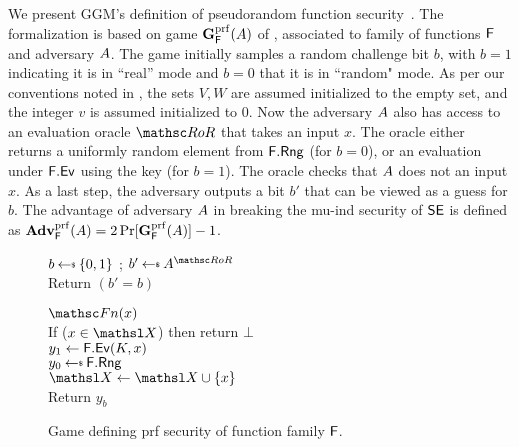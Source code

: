 
We present GGM's definition of pseudorandom function security~\cite{GolGolMic86}. The formalization is based on game $\gPRF{\FF}(\advA)$ of , associated to family of functions $\mathsf{F}$ and adversary $A$. The game initially samples a random challenge bit $b$, with $b=1$ indicating it is in ``real'' mode and $b=0$ that it is in ``random" mode. As per our conventions noted in ,  the sets $V,W$ are assumed initialized to the empty set, and the integer $v$ is assumed initialized to $0$. Now the adversary $A$ also has access to an evaluation oracle $\RoRO$ that takes an input $x$. The oracle either returns a uniformly random element from $\mathsf{F}.\mathsf{Rng}$ (for $b=0$), or an evaluation under $\mathsf{F}.\mathsf{Ev}$ using the key (for $b=1$). The oracle checks that $A$ does not an input $x$. As a last step, the adversary outputs a bit $b'$ that can be viewed as a guess for $b$.  The advantage of adversary $A$ in breaking the mu-ind security of   $\mathsf{SE}$ is defined as $\mathbf{Adv}^{\rm prf}_{\mathsf{F}}(A) = 2\Pr[\mathbf{G}^{\rm prf}_{\mathsf{F}}(A)]- 1$.

\begin{figure} [t]
{
\gameName{$\gPRF{\FF}(\advA)$} 
$b \getsr \bits$ ;
$b' \getsr \advA^{\RoRO}$\\
Return $(b' = b)$ \medskip

\underline{$\FnO(x)$}\\[2pt]
If ($x \in \setX$) then return $\bot$ \\
$y_1\gets \mathsf{F}.\mathsf{Ev}(K,x)$\\
$y_0\getsr \Rng{\FF}$ \\
$\setX \gets \setX\cup\{x\}$ \\
Return $y_b$
}
\vspace{-2ex}
\caption{Game defining prf security of function family $\mathsf{F}$.}
\label{fig-ff-prf}
\hrulefill
\end{figure}

